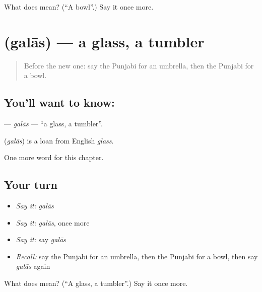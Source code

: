 \begin{tcolorbox}[breakable,colback=teal!4,colframe=teal!35!black,title={Before you move on}]
What does  mean? (\textquotedblleft{}A bowl\textquotedblright{}.) Say it once more.
\end{tcolorbox}
\section[\texorpdfstring{\pa{ਗਲਾਸ} (galās)}{ਗਲਾਸ (galās)}]{ (galās) — a glass, a tumbler}

\label{lesson:PA-C113-galas}



\begin{quote}
Before the new one: say the Punjabi for an umbrella, then the Punjabi for a bowl.
\end{quote}

\subsection*{You'll want to know: }
\textbf{} — \emph{galās} — \textquotedblleft{}a glass, a tumbler\textquotedblright{}.

\begin{cousinweb}
\textbf{} (\emph{galās}) is a loan from English \emph{glass}.
\end{cousinweb}

\begin{grammarlens}[title={What you've built}]
One more word for this chapter.
\end{grammarlens}

\subsection*{Your turn}
\begin{itemize}
\raggedright
  \item \emph{Say it:} \emph{galās}
  \item \emph{Say it:} \emph{galās}, once more
  \item \emph{Say it:} say \emph{galās}
  \item \emph{Recall:} say the Punjabi for an umbrella, then the Punjabi for a bowl, then say \emph{galās} again
\end{itemize}

\begin{tcolorbox}[breakable,colback=teal!4,colframe=teal!35!black,title={Before you move on}]
What does  mean? (\textquotedblleft{}A glass, a tumbler\textquotedblright{}.) Say it once more.
\end{tcolorbox}

